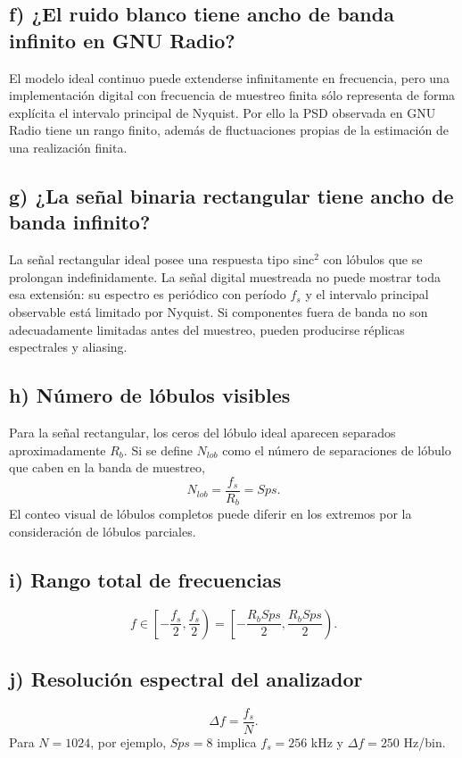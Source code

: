 \documentclass[journal]{IEEEtran}
\begin{document}
\subsection{f) ¿El ruido blanco tiene ancho de banda infinito en GNU Radio?}
El modelo ideal continuo puede extenderse infinitamente en frecuencia, pero una implementación digital con frecuencia de muestreo finita sólo representa de forma explícita el intervalo principal de Nyquist. Por ello la PSD observada en GNU Radio tiene un rango finito, además de fluctuaciones propias de la estimación de una realización finita.

\subsection{g) ¿La señal binaria rectangular tiene ancho de banda infinito?}
La señal rectangular ideal posee una respuesta tipo sinc$^2$ con lóbulos que se prolongan indefinidamente. La señal digital muestreada no puede mostrar toda esa extensión: su espectro es periódico con período $f_s$ y el intervalo principal observable está limitado por Nyquist. Si componentes fuera de banda no son adecuadamente limitadas antes del muestreo, pueden producirse réplicas espectrales y aliasing.

\subsection{h) Número de lóbulos visibles}
Para la señal rectangular, los ceros del lóbulo ideal aparecen separados aproximadamente $R_b$. Si se define $N_{lob}$ como el número de separaciones de lóbulo que caben en la banda de muestreo,
\begin{equation}
N_{lob}=\frac{f_s}{R_b}=Sps.
\end{equation}
El conteo visual de lóbulos completos puede diferir en los extremos por la consideración de lóbulos parciales.

\subsection{i) Rango total de frecuencias}
\begin{equation}
f\in\left[-\frac{f_s}{2},\frac{f_s}{2}\right)
=\left[-\frac{R_bSps}{2},\frac{R_bSps}{2}\right).
\end{equation}

\subsection{j) Resolución espectral del analizador}
\begin{equation}
\Delta f=\frac{f_s}{N}.
\end{equation}
Para $N=1024$, por ejemplo, $Sps=8$ implica $f_s=256$ kHz y $\Delta f=250$ Hz/bin.
\end{document}
